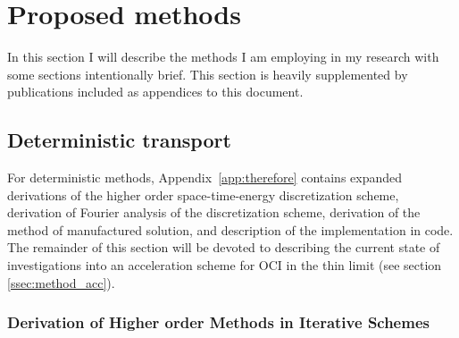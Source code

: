 \chapter{Proposed methods}
\label{ch:methods}

In this section I will describe the methods I am employing in my research with some sections intentionally brief.
This section is heavily supplemented by publications included as appendices to this document.

\section{Deterministic transport}

For deterministic methods, Appendix~\ref{app:therefore} contains expanded derivations of the higher order space-time-energy discretization scheme, derivation of Fourier analysis of the discretization scheme, derivation of the method of manufactured solution, and description of the implementation in code.
The remainder of this section will be devoted to describing the current state of investigations into an acceleration scheme for OCI in the thin limit (see section \ref{ssec:method_acc}).

\subsection{Derivation of Higher order Methods in Iterative Schemes}

